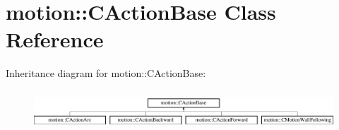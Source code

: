 \hypertarget{classmotion_1_1CActionBase}{}\section{motion\+:\+:C\+Action\+Base Class Reference}
\label{classmotion_1_1CActionBase}
Inheritance diagram for motion\+:\+:C\+Action\+Base\+:\begin{figure}[H]
\begin{center}
\leavevmode
\includegraphics[height=1.497326cm]{classmotion_1_1CActionBase}
\end{center}
\end{figure}
